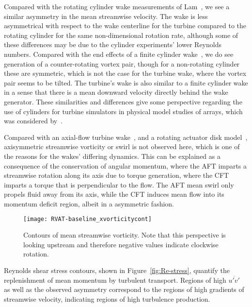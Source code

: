 Compared with the rotating cylinder wake measurements of Lam~\cite{Lam2009}, we
see a similar asymmetry in the mean streamwise velocity. The wake is less
asymmetrical with respect to the wake centerline for the turbine compared to the
rotating cylinder for the same non-dimensional rotation rate, although some of
these differences may be due to the cylinder experiments' lower Reynolds
numbers. Compared with the end effects of a finite cylinder
wake~\cite{Sumner2004}, we do see generation of a counter-rotating vortex pair,
though for a non-rotating cylinder these are symmetric, which is not the case
for the turbine wake, where the vortex pair seems to be tilted. The turbine's
wake is also similar to a finite cylinder wake in a sense that there is a mean
downward velocity directly behind the wake generator. These similarities and
differences give some perspective regarding the use of cylinders for turbine
simulators in physical model studies of arrays, which was considered
by~\cite{Pierce2013}.

Compared with an axial-flow turbine wake~\cite{Cal2010}, and a rotating actuator
disk model~\cite{Wu2011}, axisymmetric streamwise vorticity or swirl is not
observed here, which is one of the reasons for the wakes' differing dynamics.
This can be explained as a consequence of the conservation of angular momentum,
where the AFT imparts a streamwise rotation along its axis due to torque
generation, where the CFT imparts a torque that is perpendicular to the flow.
The AFT mean swirl only propels fluid away from its axis, while the CFT induces
mean flow into its momentum deficit region, albeit in a asymmetric fashion.

\begin{figure}
    \centering
    
    \texttt{[image: RVAT-baseline\_xvorticitycont]}

    \caption{Contours of mean streamwise vorticity. Note that this perspective
        is looking upstream and therefore negative values indicate clockwise
        rotation.}
    
    \label{fig:RVAT-baseline-xvorticity}
\end{figure}

Reynolds shear stress contours, shown in Figure~\ref{fig:Re-stress}, quantify the
replenishment of mean momentum by turbulent transport. Regions of high
$\overline{u'v'}$ as well as the observed asymmetry correspond to the regions of
high gradients of streamwise velocity, indicating regions of high turbulence
production.


